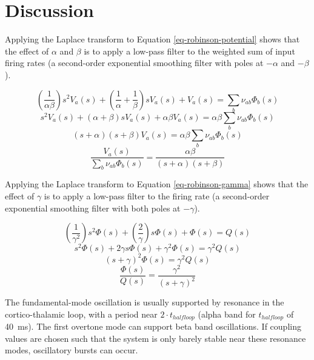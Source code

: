 %
%
\section{Discussion}
\label{sect-robinson-discussion}

Applying the Laplace transform to Equation \ref{eq-robinson-potential} shows
that the effect of $\alpha$ and $\beta$ is to apply a low-pass filter to the
weighted sum of input firing rates (a second-order exponential smoothing
filter with poles at $-\alpha$ and $-\beta$).

\begin{equation}
\left ( \frac{1}{\alpha \beta} \right ) s^2 V_a(s)
+ \left ( \frac{1}{\alpha} + \frac{1}{\beta} \right ) s V_a(s)
+ V_a(s) = \sum_b \nu_{ab} \Phi_b(s)
\end{equation}
%
\begin{equation}
s^2 V_a(s) + (\alpha + \beta) s V_a(s) + \alpha \beta V_a(s)
= \alpha \beta \sum_b \nu_{ab} \Phi_b(s)
\end{equation}
%
\begin{equation}
(s + \alpha) (s + \beta) V_a(s) = \alpha \beta \sum_b \nu_{ab} \Phi_b(s)
\end{equation}
%
\begin{equation}
\frac{V_a(s)}{\sum_b \nu_{ab} \Phi_b(s)}
= \frac{\alpha \beta}{(s + \alpha) (s + \beta)}
\end{equation}

Applying the Laplace transform to Equation \ref{eq-robinson-gamma} shows
that the effect of $\gamma$ is to apply a low-pass filter to the firing rate
(a second-order exponential smoothing filter with both poles at $-\gamma$).

\begin{equation}
\left ( \frac{1}{\gamma^2} \right ) s^2 \Phi(s)
+ \left ( \frac{2}{\gamma} \right ) s \Phi(s) + \Phi(s) = Q(s)
\end{equation}
%
\begin{equation}
s^2 \Phi(s) + 2 \gamma s \Phi(s) + \gamma^2 \Phi(s) = \gamma^2 Q(s)
\end{equation}
%
\begin{equation}
(s + \gamma)^2 \Phi(s) = \gamma^2 Q(s)
\end{equation}
%
\begin{equation}
\frac{\Phi(s)}{Q(s)} = \frac{\gamma^2}{(s + \gamma)^2}
\end{equation}

The fundamental-mode oscillation is usually supported by resonance in the
cortico-thalamic loop, with a period near $2 \cdot t_{halfloop}$ (alpha band
for $t_{halfloop}$ of 40~ms). The first overtone mode can support beta band
oscillations. If coupling values are chosen such that the system is only
barely stable near these resonance modes, oscillatory bursts can occur.

